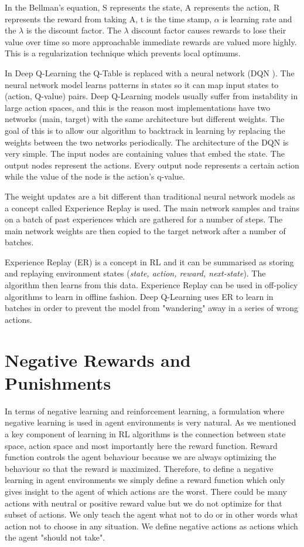 \documentclass[b5paper]{book}
\let\cite\parencite
\begin{document}
In the Bellman's equation, S represents the state, A represents the action, R represents the reward from taking A, t is the time stamp, \(\alpha\) is learning rate and the \(\lambda\) is the discount factor. The \(\lambda\) discount factor causes rewards to lose their value over time so more approachable immediate rewards are valued more highly. This is a regularization technique which prevents local optimums.

In Deep Q-Learning the Q-Table is replaced with a neural network (DQN \cite{mnih2013playing}). The neural network model learns patterns in states so it can map input states to (action, Q-value) pairs. Deep Q-Learning models usually suffer from instability in large action spaces, and this is the reason most implementations have two networks (main, target) with the same architecture but different weights. The goal of this is to allow our algorithm to backtrack in learning by replacing the weights between the two networks periodically. The architecture of the DQN is very simple. The input nodes are containing values that embed the state. The output nodes represent the actions. Every output node represents a certain action while the value of the node is the action's q-value. 

The weight updates are a bit different than traditional neural network models as a concept called Experience Replay is used. The main network samples and trains on a batch of past experiences which are gathered for a number of steps. The main network weights are then copied to the target network after a number of batches.

Experience Replay (ER) is a concept in RL and it can be summarised as storing and replaying environment states (\emph{state, action, reward, next-state}). The algorithm then learns from this data. Experience Replay can be used in off-policy algorithms to learn in offline fashion. Deep Q-Learning uses ER to learn in batches in order to prevent the model from "wandering" away in a series of wrong actions.

\section{Negative Rewards and Punishments}

In terms of negative learning and reinforcement learning, a formulation where negative learning is used in agent environments is very natural. As we mentioned a key component of learning in RL algorithms is the connection between state space, action space and most importantly here the reward function. Reward function controls the agent behaviour because we are always optimizing the behaviour so that the reward is maximized. Therefore, to define a negative learning in agent environments we simply define a reward function which only gives insight to the agent of which actions are the worst. There could be many actions with neutral or positive reward value but we do not optimize for that subset of actions. We only teach the agent what not to do or in other words what action not to choose in any situation. We define negative actions as actions which the agent "should not take".
\end{document}
